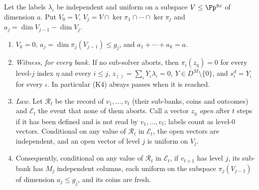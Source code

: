 \begin{lemma}
\label{lem:fc-split-law}
Let the labels $\lambda_\iota$ be independent and uniform on a subspace $V \le \Fp^{g_d}$ of dimension $a$. Put $V_0 = V$, $V_j = V \cap \ker\pi_1 \cap \cdots \cap \ker\pi_j$ and $a_j = \dim V_{j-1} - \dim V_j$.
\begin{enumerate}[label=(\alph*),leftmargin=2em]
  \item $V_k = 0$, $a_j = \dim\pi_j(V_{j-1}) \le g_j$, and $a_1 + \cdots + a_k = a$.
  \item \emph{Witness, for every bank.} If no sub-solver aborts, then $\pi_i(z_\eta) = 0$ for every level-$j$ index $\eta$ and every $i \le j$, $z_{()} = \sum_\iota Y_\iota\lambda_\iota = 0$, $Y \in D^M\setminus\{0\}$, and $s_\iota^d = Y_\iota$ for every $\iota$. In particular (K4) always passes when it is reached.
  \item \emph{Law.} Let $\mathcal{R}_t$ be the record of $v_1,\dots,v_t$ (their sub-banks, coins and outcomes) and $\mathcal{E}_t$ the event that none of them aborts. Call a vector $z_\eta$ \emph{open} after $t$ steps if it has been defined and is not read by $v_1,\dots,v_t$; labels count as level-$0$ vectors. Conditional on any value of $\mathcal{R}_t$ in $\mathcal{E}_t$, the open vectors are independent, and an open vector of level $j$ is uniform on $V_j$.
  \item Consequently, conditional on any value of $\mathcal{R}_t$ in $\mathcal{E}_t$, if $v_{t+1}$ has level $j$, its sub-bank has $M_j$ independent columns, each uniform on the subspace $\pi_j(V_{j-1})$ of dimension $a_j \le g_j$, and its coins are fresh.
\end{enumerate}
\end{lemma}

